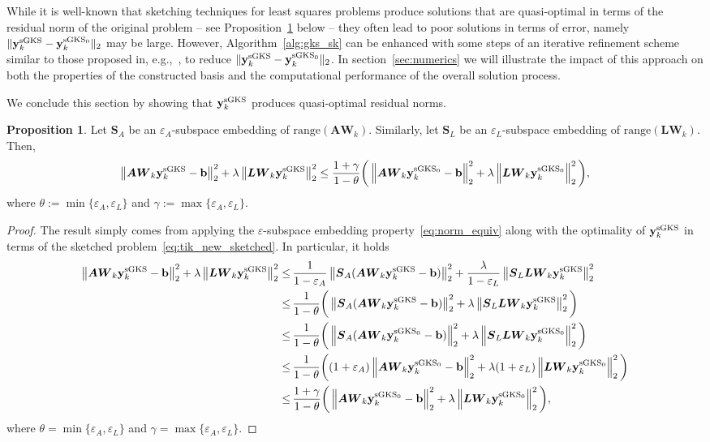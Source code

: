 \documentclass[%
  a4paper,
  onecolumn,
  colorlinks,
]{preprint}
\theoremstyle{plain}
\theoremstyle{definition}
\newtheorem{proposition}{Proposition}
\newcommand{\norm}[1]{\left\|#1\right\|}
\newcommand{\bA}{\ensuremath{\boldsymbol{A}}}
\newcommand{\bL}{\ensuremath{\boldsymbol{L}}}
\newcommand{\bS}{\ensuremath{\boldsymbol{S}}}
\newcommand{\bW}{\ensuremath{\boldsymbol{W}}}
\newcommand{\bb}{\mathbf{b}}
\newcommand{\by}{\mathbf{y}}
\begin{document}
While it is well-known that sketching techniques for least squares problems produce solutions that are quasi-optimal in terms of the residual norm of the original problem -- see Proposition~\ref{Prop_res_sketching} below -- they often lead to poor solutions in terms of error, namely $\|\by_k^{\rm sGKS}-\by_k^{\rm sGKS_0}\|_2$ may be large. However,
 Algorithm~\ref{alg:gks_sk} can be enhanced with some steps of an iterative refinement scheme similar to those proposed in, e.g.,~\cite{Iterative_refinement_sketching}, to reduce $\|\by_k^{\rm sGKS}-\by_k^{\rm sGKS_0}\|_2$. In section~\ref{sec:numerics} we will illustrate the impact of this approach on both the properties of the constructed basis and the computational performance of the overall solution process.

We conclude this section by showing that 
$\by_k^{\rm sGKS}$ produces quasi-optimal residual norms.

\begin{proposition}\label{Prop_res_sketching}
Let $\bS_A$ be an $\varepsilon_A$-subspace embedding of $\text{range}(\bA\bW_k)$. Similarly, let $\bS_L$ be an $\varepsilon_L$-subspace embedding of $\text{range}(\bL\bW_k)$. Then,
$$\norm{\bA\bW_k\by_k^{\rm sGKS} - \bb}_2^2 + \lambda\norm{\bL\bW_k\by_k^{\rm sGKS}}_2^2\leq \frac{1+\gamma}{1-\theta}\bigg(\norm{\bA\bW_k\by_k^{\rm sGKS_0} - \bb}_2^2 +\lambda\norm{\bL\bW_k\by_k^{\rm sGKS_0}}_2^2\bigg),$$
where  $\theta:=\min\{\varepsilon_A,\varepsilon_L\}$ and $\gamma:=\max\{\varepsilon_A,\varepsilon_L\}$.
\end{proposition}

\begin{proof}
The result simply comes from applying the $\varepsilon$-subspace embedding property~\eqref{eq:norm_equiv} along with the optimality of $\by_k^{\rm sGKS}$ in terms of the sketched problem~\eqref{eq:tik_new_sketched}. In particular, it holds 
{\small
\begin{align*}
\norm{\bA\bW_k\by_k^{\rm sGKS} - \bb}_2^2+\lambda\norm{\bL\bW_k\by_k^{\rm sGKS}}_2^2\leq & \, \frac{1}{1-\varepsilon_A}\norm{\bS_A(\bA\bW_k\by_k^{\rm sGKS} - \bb)}_2^2+\frac{\lambda}{1-\varepsilon_L}\norm{\bS_L\bL\bW_k\by_k^{\rm sGKS}}_2^2\\
\leq& \,
\frac{1}{1-\theta}\bigg(\norm{\bS_A(\bA\bW_k\by_k^{\rm sGKS} - \bb)}_2^2+\lambda\norm{\bS_L\bL\bW_k\by_k^{\rm sGKS}}_2^2
\bigg)\\
\leq& \,
\frac{1}{1-\theta}\bigg(\norm{\bS_A(\bA\bW_k\by_k^{\rm sGKS_0} - \bb)}_2^2+\lambda\norm{\bS_L\bL\bW_k\by_k^{\rm sGKS_0}}_2^2
\bigg)\\
\leq &\,
\frac{1}{1-\theta}\bigg((1+\varepsilon_A)\norm{\bA\bW_k\by_k^{\rm sGKS_0} - \bb}_2^2+\lambda(1+\varepsilon_L)\norm{\bL\bW_k\by_k^{\rm sGKS_0}}_2^2
\bigg)\\
\leq&\, \frac{1+\gamma}{1-\theta}\bigg(\norm{\bA\bW_k\by_k^{\rm sGKS_0} - \bb}_2^2+\lambda\norm{\bL\bW_k\by_k^{\rm sGKS_0}}_2^2
\bigg),
\end{align*}
}
where $\theta=\min\{\varepsilon_A,\varepsilon_L\}$ and $\gamma=\max\{\varepsilon_A,\varepsilon_L\}$.
\end{proof}
\end{document}
